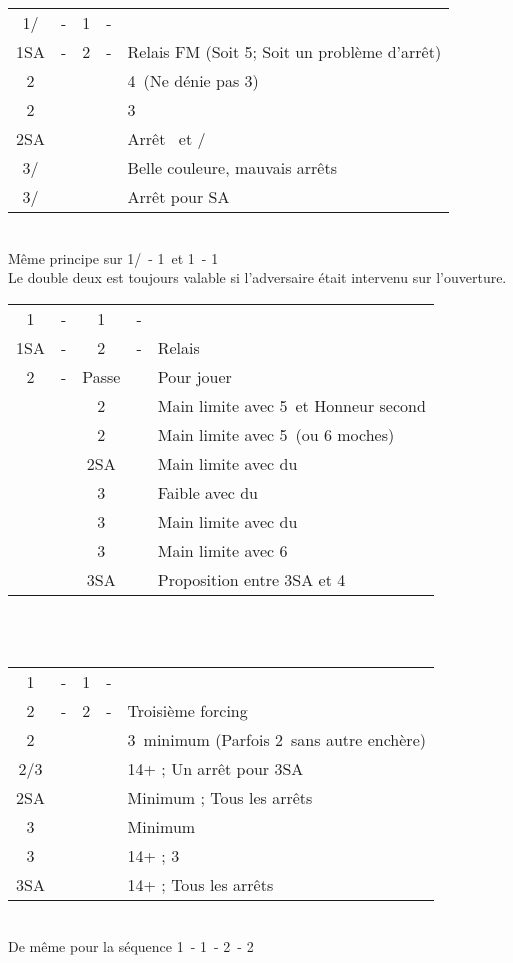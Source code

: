 \documentclass[a4paper, oneside, 11pt]{report}
\begin{document}
		\begin{tabular}{cccc|l}
		1\trefle/\carreau & - & 1\pique & - &\\
		1SA & - & 2\carreau & - & Relais FM (Soit 5\pique ; Soit un problème d'arrêt)\\
		2\coeur &&&& 4\coeur\ (Ne dénie pas 3\pique)\\
		2\pique &&&& 3\pique\\
		2SA &&&& Arrêt \coeur\ et \carreau/\trefle\\
		3\trefle/\carreau &&&& Belle couleure, mauvais arrêts\\
		3\carreau/\trefle &&&& Arrêt pour SA\\
		\end{tabular}\\
		Même principe sur 1\trefle/\carreau\ - 1\coeur\ et 1\coeur\ - 1\pique\\

		Le double deux est toujours valable si l'adversaire était intervenu sur l'ouverture. \\

		\begin{tabular}{cccc|l}
		1\coeur & - & 1\pique & - &\\
		1SA & - & 2\trefle & - & Relais\\
		2\carreau & - & Passe && Pour jouer\\
		&& 2\coeur && Main limite avec 5\pique\ et Honneur second \coeur\\
		&& 2\pique && Main limite avec 5\pique\ (ou 6 moches)\\
		&& 2SA && Main limite avec du \trefle\\
		&& 3\trefle && Faible avec du \trefle\\
		&& 3\carreau && Main limite avec du \carreau\\
		&& 3\pique && Main limite avec 6\pique\\
		&& 3SA && Proposition entre 3SA et 4\pique\\
		\end{tabular}\\\\
	
		\begin{tabular}{cccc|l}
		1\trefle & - & 1\coeur & - &\\
		2\trefle & - & 2\carreau & - & Troisième forcing\\
		2\coeur &&&& 3\coeur\ minimum (Parfois 2\coeur\ sans autre enchère)\\
		2\pique/3\carreau &&&& 14+ ; Un arrêt pour 3SA\\
		2SA &&&& Minimum ; Tous les arrêts\\
		3\trefle &&&& Minimum\\
		3\coeur &&&& 14+ ; 3\coeur\\
		3SA &&&& 14+ ; Tous les arrêts\\
		\end{tabular}\\
		De même pour la séquence 1\carreau\ - 1\pique\ - 2\carreau\ - 2\coeur\\
			
\end{document}
